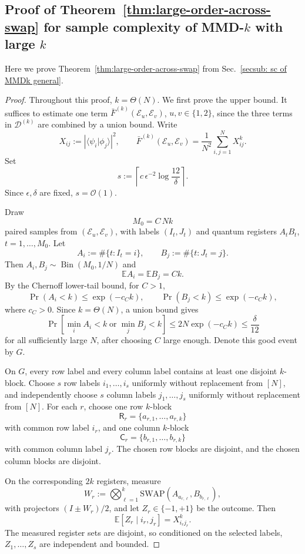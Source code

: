 \documentclass[aps,prx,reprint,superscriptaddress,amsmath,amssymb,longbibliography,floatfix]{revtex4-2}
\newcommand{\Abs}[1]{\left\lvert #1\right\rvert}
\providecommand{\braket}[2]{\langle #1|#2 \rangle}
\newcommand{\dsE}{\mathbb{E}}
\newcommand{\scD}{\mathcal{D}}
\newcommand{\scE}{\mathcal{E}}
\newcommand{\scO}{\mathcal{O}}
\theoremstyle{plain}
\theoremstyle{definition}
\theoremstyle{remark}
\begin{document}
\subsection{Proof of Theorem~\ref{thm:large-order-across-swap} for sample complexity of MMD-$k$ with large $k$ }
\label{app:large-order-across-swap-proof}


Here we prove Theorem~\ref{thm:large-order-across-swap} from Sec.~\ref{secsub: sc of MMDk general}.
\begin{proof}
Throughout this proof, \(k=\Theta(N)\). We first prove the upper bound. It suffices to
estimate one term \(\bar F^{(k)}(\scE_u,\scE_v)\), \(u,v\in\{1,2\}\), since the three
terms in \(\scD^{(k)}\) are combined by a union bound. Write
\[
    X_{ij}:=\Abs{\braket{\psi_i}{\phi_j}}^2,
    \qquad
    \bar F^{(k)}(\scE_u,\scE_v)
    =
    \frac1{N^2}\sum_{i,j=1}^N X_{ij}^k .
\]
Set
\[
    s:=\left\lceil c\,\epsilon^{-2}\log\frac{12}{\delta}\right\rceil .
\]
Since \(\epsilon,\delta\) are fixed, \(s=\scO(1)\).

Draw
\[
    M_0=C\,Nk
\]
paired samples from \((\scE_u,\scE_v)\), with labels \((I_t,J_t)\) and quantum registers
\(A_tB_t\), \(t=1,\ldots,M_0\). Let
\[
    A_i:=\#\{t:I_t=i\},
    \qquad
    B_j:=\#\{t:J_t=j\}.
\]
Then \(A_i,B_j\sim\operatorname{Bin}(M_0,1/N)\) and
\[
    \dsE A_i=\dsE B_j=Ck .
\]
By the Chernoff lower-tail bound, for \(C>1\),
\[
    \Pr(A_i<k)
    \le
    \exp(-c_C k),
    \qquad
    \Pr(B_j<k)
    \le
    \exp(-c_C k),
\]
where \(c_C>0\). Since \(k=\Theta(N)\), a union bound gives
\[
    \Pr\!\left[
        \min_i A_i<k
        \;\text{or}\;
        \min_j B_j<k
    \right]
    \le
    2N\exp(-c_C k)
    \le
    \frac{\delta}{12}
\]
for all sufficiently large \(N\), after choosing \(C\) large enough. Denote this good event by \(G\).

On \(G\), every row label and every column label contains at least one disjoint \(k\)-block.
Choose \(s\) row labels \(i_1,\ldots,i_s\) uniformly without replacement from \([N]\), and
independently choose \(s\) column labels \(j_1,\ldots,j_s\) uniformly without replacement
from \([N]\). For each \(r\), choose one row \(k\)-block
\[
    \mathsf R_r=\{a_{r,1},\ldots,a_{r,k}\}
\]
with common row label \(i_r\), and one column \(k\)-block
\[
    \mathsf C_r=\{b_{r,1},\ldots,b_{r,k}\}
\]
with common column label \(j_r\). The chosen row blocks are disjoint, and the chosen column
blocks are disjoint.

On the corresponding \(2k\) registers, measure
\begin{equation}
    W_r
    :=
    \bigotimes_{\ell=1}^k
    \mathrm{SWAP}\!\left(A_{a_{r,\ell}},B_{b_{r,\ell}}\right),
\label{eq:app-large-k-swap-observable}
\end{equation}
with projectors \((I\pm W_r)/2\), and let \(Z_r\in\{-1,+1\}\) be the outcome. Then
\[
    \dsE[Z_r\mid i_r,j_r]=X_{i_rj_r}^k .
\]
The measured register sets are disjoint, so conditioned on the selected labels,
\(Z_1,\ldots,Z_s\) are independent and bounded.


\end{proof}
\end{document}
